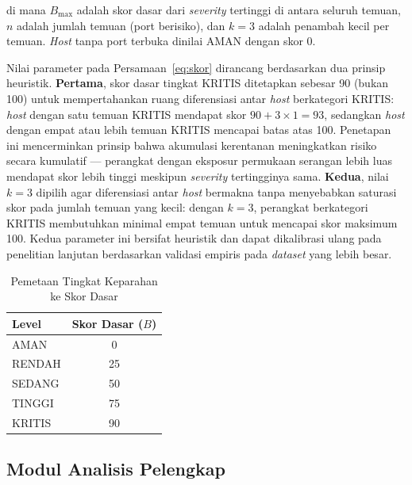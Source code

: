 \documentclass[conference]{IEEEtran}
\begin{document}
\noindent di mana $B_{\max}$ adalah skor dasar dari \textit{severity}
tertinggi di antara seluruh temuan, $n$ adalah jumlah temuan (port
berisiko), dan $k = 3$ adalah penambah kecil per temuan. \textit{Host}
tanpa port terbuka dinilai AMAN dengan skor 0.

Nilai parameter pada Persamaan~\eqref{eq:skor} dirancang berdasarkan dua
prinsip heuristik. \textbf{Pertama}, skor dasar tingkat KRITIS ditetapkan
sebesar 90 (bukan 100) untuk mempertahankan ruang diferensiasi antar
\textit{host} berkategori KRITIS: \textit{host} dengan satu temuan KRITIS
mendapat skor $90 + 3 \times 1 = 93$, sedangkan \textit{host} dengan empat
atau lebih temuan KRITIS mencapai batas atas 100. Penetapan ini
mencerminkan prinsip bahwa akumulasi kerentanan meningkatkan risiko
secara kumulatif --- perangkat dengan eksposur permukaan serangan lebih
luas mendapat skor lebih tinggi meskipun \textit{severity} tertingginya
sama. \textbf{Kedua}, nilai $k = 3$ dipilih agar diferensiasi antar
\textit{host} bermakna tanpa menyebabkan saturasi skor pada jumlah temuan
yang kecil: dengan $k = 3$, perangkat berkategori KRITIS membutuhkan
minimal empat temuan untuk mencapai skor maksimum 100. Kedua parameter
ini bersifat heuristik dan dapat dikalibrasi ulang pada penelitian
lanjutan berdasarkan validasi empiris pada \textit{dataset} yang lebih
besar.

\begin{table}[htbp]
\caption{Pemetaan Tingkat Keparahan ke Skor Dasar}
\label{tab:severity}
\renewcommand{\arraystretch}{1.2}
\begin{tabular}{|l|c|}
\hline
\textbf{Level} & \textbf{Skor Dasar ($B$)} \\
\hline
AMAN   & 0  \\
\hline
RENDAH & 25 \\
\hline
SEDANG & 50 \\
\hline
TINGGI & 75 \\
\hline
KRITIS & 90 \\
\hline
\end{tabular}
\end{table}

\subsection{Modul Analisis Pelengkap}
\end{document}
